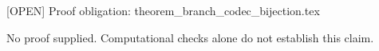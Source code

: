 \documentclass{article}
\begin{document}
[OPEN] Proof obligation: theorem\_branch\_codec\_bijection.tex

No proof supplied. Computational checks alone do not establish this claim.
\end{document}
